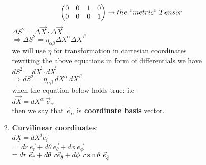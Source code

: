 \documentclass[11pt,a4paper]{article}
\begin{document}
\begin{enumerate}
\begin{enumerate}
\begin{enumerate}
\[\begin{pmatrix}
                                                0  & 0 & 1 & 0 \\
                                                0  & 0 & 0 & 1 \\\end{pmatrix} \rightarrow the\ "metric"\ Tensor \]
                                    $\Delta{S^2} = \Delta \vec{X} \cdot \Delta\vec{X}$\\
                                    $\Rightarrow \Delta{S^2} = {\displaystyle{\eta_{\alpha\beta}}} \Delta X^{\alpha} \Delta X^{\beta}$\\
                                    we will use $\eta$ for transformation in cartesian coordinates\\
                                    rewriting the above equations in form of differentials we have\\
                                    $d{S^2} = d \vec{X} \cdot d\vec{X}$\\
                                    $\Rightarrow d {S^2} = {\displaystyle{\eta_{\alpha\beta}}}\ d X^{\alpha}\ d X^{\beta}$\\

                                    when the equation below holds true: i.e\\
                                    $d\vec{X}= dX^{\alpha}\ \vec{e}_{\alpha}$\\
                                    then we say that $\vec{e}_{\alpha}$ is \textbf{coordinate basis} vector.
                              \item \textbf{Curvilinear coordinates}:\\
                                    $d\underset{\sim}{X} = dX^i \vec{e_i}$\\
                                    $= d{r}\ \vec{e_r} + d\theta\ \vec{e_{\theta}} +d\phi\ \vec{e_{\phi}} $\\
                                    $= d{r}\ \vec{e}_{\hat{r}} + d\theta\ r \vec{e}_{\hat{\theta}} +d\phi\ r \sin\theta\ \vec{e}_{\Hat{\phi}} $\\


\end{enumerate}
\end{enumerate}
\end{enumerate}
\end{document}
